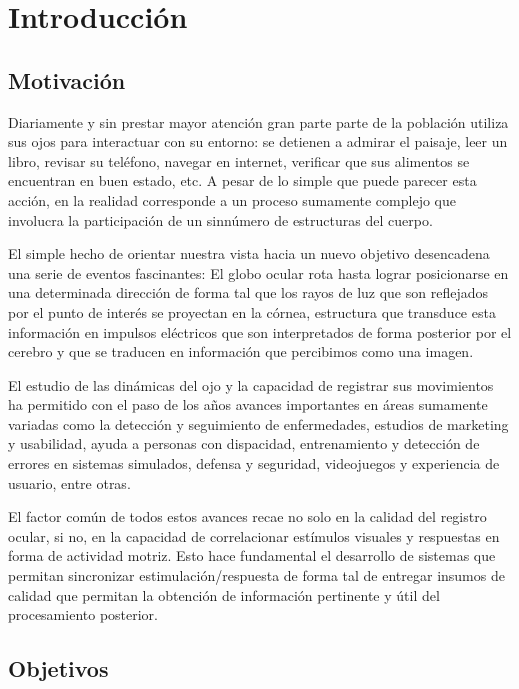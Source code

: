 \documentclass[../main.tex]{subfiles}
\begin{document}
		
\chapter{Introducción}
\label{cha:01_introducción}
	\section{Motivación}
	\label{sec:01_motivacion}

		Diariamente y sin prestar mayor atención gran parte parte de la población utiliza sus ojos para interactuar con su entorno: se detienen a admirar el paisaje, leer un libro, revisar su teléfono, navegar en internet, verificar que sus alimentos se encuentran en buen estado, etc. A pesar de lo simple que puede parecer esta acción, en la realidad corresponde a un proceso sumamente complejo que involucra la participación de un sinnúmero de estructuras del cuerpo. 

		El simple hecho de orientar nuestra vista hacia un nuevo objetivo desencadena una serie de eventos fascinantes: El globo ocular rota hasta lograr posicionarse en una determinada dirección de forma tal que los rayos de luz que son reflejados por el punto de interés se proyectan en la córnea, estructura que transduce esta información en impulsos eléctricos que son interpretados de forma posterior por el cerebro y que se traducen en información que percibimos como una imagen. 

		El estudio de las dinámicas del ojo y la capacidad de registrar sus movimientos ha permitido con el paso de los años avances importantes en áreas sumamente variadas como la detección y seguimiento de enfermedades, estudios de marketing y usabilidad, ayuda a personas con dispacidad, entrenamiento y detección de errores en sistemas simulados, defensa y seguridad, videojuegos y experiencia de usuario, entre otras.

		El factor común de todos estos avances recae no solo en la calidad del registro ocular, si no, en la capacidad de correlacionar estímulos visuales y respuestas en forma de actividad motriz. Esto hace fundamental el desarrollo de sistemas que permitan sincronizar estimulación/respuesta de forma tal de entregar insumos de calidad que permitan la obtención de información pertinente y útil del procesamiento posterior.  

	\section{Objetivos}
	\label{sec:01_objetivos}
\end{document}

